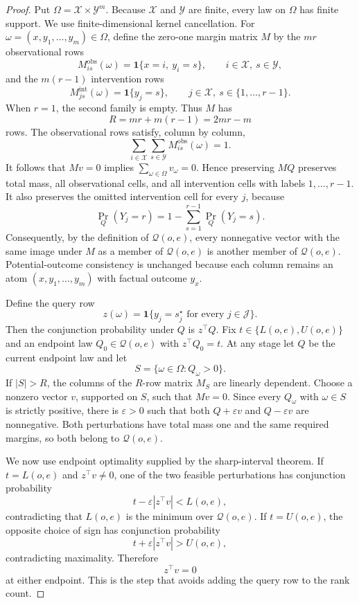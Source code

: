 \documentclass{article}
\begin{document}
\begin{proof}
Put \(\Omega=\mathcal X\times\mathcal Y^m\).  Because \(\mathcal X\) and \(\mathcal Y\) are finite, every law on \(\Omega\) has finite support.  We use finite-dimensional kernel cancellation.  For \(\omega=(x,y_1,\ldots,y_m)\in\Omega\), define the zero-one margin matrix \(M\) by the \(mr\) observational rows
\[
 M^{\mathrm{obs}}_{is}(\omega)=\mathbf 1\{x=i,\ y_i=s\},
 \qquad i\in\mathcal X,\ s\in\mathcal Y,
\]
and the \(m(r-1)\) intervention rows
\[
 M^{\mathrm{int}}_{js}(\omega)=\mathbf 1\{y_j=s\},
 \qquad j\in\mathcal X,\ s\in\{1,\ldots,r-1\}.
\]
When \(r=1\), the second family is empty.  Thus \(M\) has
\[
 R=mr+m(r-1)=2mr-m
\]
rows.  The observational rows satisfy, column by column,
\[
 \sum_{i\in\mathcal X}\sum_{s\in\mathcal Y}
 M^{\mathrm{obs}}_{is}(\omega)=1.
\]
It follows that \(Mv=0\) implies \(\sum_{\omega\in\Omega}v_\omega=0\).  Hence preserving \(MQ\) preserves total mass, all observational cells, and all intervention cells with labels \(1,\ldots,r-1\).  It also preserves the omitted intervention cell for every \(j\), because
\[
 \Pr_Q(Y_j=r)=1-\sum_{s=1}^{r-1}\Pr_Q(Y_j=s).
\]
Consequently, by the definition of \(\mathcal Q(o,e)\), every nonnegative vector with the same image under \(M\) as a member of \(\mathcal Q(o,e)\) is another member of \(\mathcal Q(o,e)\).  Potential-outcome consistency is unchanged because each column remains an atom \((x,y_1,\ldots,y_m)\) with factual outcome \(y_x\).

Define the query row
\[
 z(\omega)=\mathbf 1\{y_j=s_j^\star\text{ for every }j\in\mathcal J\}.
\]
Then the conjunction probability under \(Q\) is \(z^\top Q\).  Fix \(t\in\{L(o,e),U(o,e)\}\) and an endpoint law \(Q_0\in\mathcal Q(o,e)\) with \(z^\top Q_0=t\).  At any stage let \(Q\) be the current endpoint law and let
\[
 S=\{\omega\in\Omega:Q_\omega>0\}.
\]
If \(|S|>R\), the columns of the \(R\)-row matrix \(M_S\) are linearly dependent.  Choose a nonzero vector \(v\), supported on \(S\), such that \(Mv=0\).  Since every \(Q_\omega\) with \(\omega\in S\) is strictly positive, there is \(\varepsilon>0\) such that both \(Q+\varepsilon v\) and \(Q-\varepsilon v\) are nonnegative.  Both perturbations have total mass one and the same required margins, so both belong to \(\mathcal Q(o,e)\).

We now use endpoint optimality supplied by the sharp-interval theorem.  If \(t=L(o,e)\) and \(z^\top v\neq0\), one of the two feasible perturbations has conjunction probability
\[
 t-\varepsilon|z^\top v|<L(o,e),
\]
contradicting that \(L(o,e)\) is the minimum over \(\mathcal Q(o,e)\).  If \(t=U(o,e)\), the opposite choice of sign has conjunction probability
\[
 t+\varepsilon|z^\top v|>U(o,e),
\]
contradicting maximality.  Therefore
\[
 z^\top v=0
\]
at either endpoint.  This is the step that avoids adding the query row to the rank count.


\end{proof}
\end{document}
